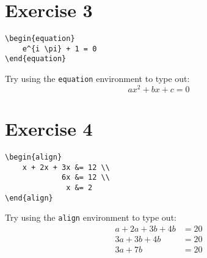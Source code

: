 \documentclass{article}
\begin{document}
\pagebreak

    \section*{Exercise 3}
    \begin{mdframed}
\begin{verbatim}
\begin{equation}
    e^{i \pi} + 1 = 0
\end{equation}
\end{verbatim}
    \end{mdframed}
    \begin{mdframed}
        Try using the \verb|equation| environment to type out:
        \begin{equation}
            ax^2 + bx + c = 0
        \end{equation}
    \end{mdframed}


    \section*{Exercise 4}
    \begin{mdframed}
\begin{verbatim}
\begin{align}
    x + 2x + 3x &= 12 \\
             6x &= 12 \\
              x &= 2
\end{align}
\end{verbatim}
    \end{mdframed}
    \begin{mdframed}
        Try using the \verb|align| environment to type out:
        \begin{align}
            a + 2a + 3b + 4b &= 20 \\
            3a + 3b + 4b &= 20 \\
            3a + 7b &= 20
        \end{align}
    \end{mdframed}
\end{document}
